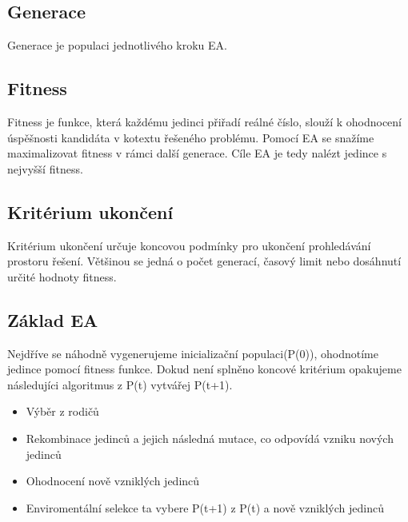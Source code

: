 \subsection{Generace}
Generace je populaci jednotlivého kroku EA.
\subsection{Fitness}
Fitness je funkce, která každému jedinci přiřadí reálné číslo, slouží k ohodnocení úspěšnosti kandidáta v kotextu řešeného problému. Pomocí EA se snažíme maximalizovat fitness v rámci další generace. Cíle EA je tedy nalézt jedince s nejvyšší fitness. 
\subsection{Kritérium ukončení}
Kritérium ukončení určuje koncovou podmínky pro ukončení prohledávání prostoru řešení. Většinou se jedná o počet generací, časový limit nebo dosáhnutí určité hodnoty fitness.  
\subsection{Základ EA}
Nejdříve se náhodně vygenerujeme inicializační populaci(P(0)), ohodnotíme jedince pomocí fitness funkce. Dokud není splněno koncové kritérium opakujeme následujíci algoritmus z P(t) vytvářej P(t+1). 
\begin{itemize}
    \item Výběr z rodičů 
    \item Rekombinace jedinců a jejich následná mutace, co odpovídá vzniku nových jedinců
    \item Ohodnocení nově vzniklých jedinců
    \item Enviromentální selekce ta vybere P(t+1) z P(t) a nově vzniklých jedinců
\end{itemize}

